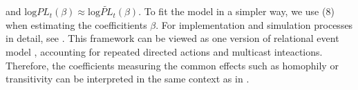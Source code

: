 \documentclass[a4paper]{article}
\begin{document}
and $\mbox{log}PL_t(\beta)\approx \mbox{log}\widetilde{PL}_t(\beta)$. To fit the model in a simpler way, we use (8) when estimating the coefficitients $\beta$. For implementation and simulation processes in detail, see \cite{PerryWolfe2012}.  This framework can be viewed as one version of relational event model \cite{Butts2008}, accounting for repeated directed actions and multicast inteactions. Therefore, the coefficients measuring the common effects such as homophily or transitivity can be interpreted in the same context as in \cite{Butts2008}.

\end{document}
